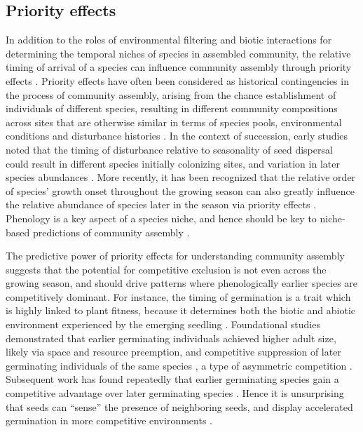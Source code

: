 \documentclass[11pt]{article}
\begin{document}
\subsection*{Priority effects}

In addition to the roles of environmental filtering and biotic interactions for determining the temporal niches of species in assembled community, the relative timing of arrival of a species can influence community assembly through priority effects \citep{alford1985priority,chase2003community,fukami2015historical}. Priority effects have often been considered as historical contingencies in the process of community assembly, arising from the chance establishment of individuals of different species, resulting in different community compositions across sites that are otherwise similar in terms of species pools, environmental conditions and disturbance histories \citep[e.g.][]{diamond1975assembly}. In the context of succession, early studies noted that the timing of disturbance relative to seasonality of seed dispersal could result in different species initially colonizing sites, and variation in later species abundances \citep{keever1950causes,holt1972effect}. More recently, it has been recognized that the relative order of species’ growth onset throughout the growing season can also greatly influence the relative abundance of species later in the season via priority effects \citep{fukami2015historical,wainwright2012seasonal,rudolf2019role}.  Phenology is a key aspect of a species niche, and hence should be key to niche-based predictions of community assembly \citep{vannette2014historical}.

The predictive power of priority effects for understanding community assembly suggests that the potential for competitive exclusion is not even across the growing season, and should drive patterns where phenologically earlier species are competitively dominant. For instance, the timing of germination is a trait which is highly linked to plant fitness, because it determines both the biotic and abiotic environment experienced by the emerging seedling \citep{donohue2010germination}. Foundational studies demonstrated that earlier germinating individuals achieved higher adult size, likely via space and resource preemption, and competitive suppression of later germinating individuals of the same species \citep{ross1972occupation},  a type of asymmetric competition \citep{connolly1996asymmetric}. Subsequent work has found repeatedly that earlier germinating species gain a competitive advantage over later germinating species \citep{cleland2015priority,waterton2016trade,blackford2020species}. Hence it is unsurprising that seeds can “sense” the presence of neighboring seeds, and display accelerated germination in more competitive environments \citep{dyer2000accelerated}.
\end{document}
